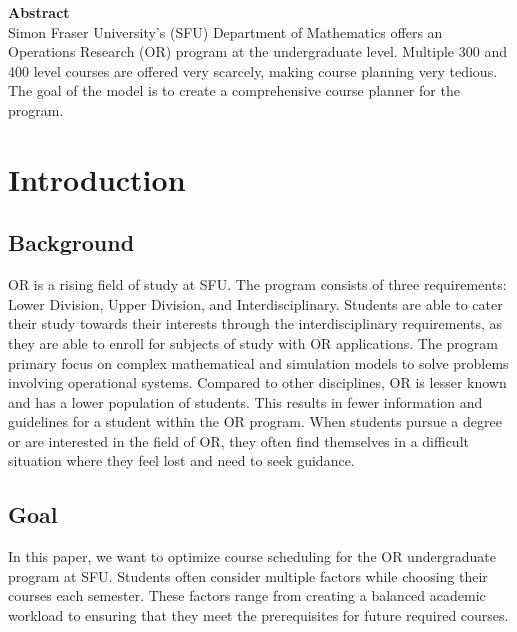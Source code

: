 \documentclass{article}
\begin{document}
\begin{titlepage}
	\vspace{5\baselineskip} %
	
	
	
	

\begin{center}
    \textbf{\large Abstract}\\
Simon Fraser University's (SFU) Department of Mathematics offers an Operations Research (OR) program at the undergraduate level. Multiple 300 and 400 level courses are offered very scarcely, making course planning very tedious. The goal of the model is to create a comprehensive course planner for the program.
\end{center}

\end{titlepage}





\section{Introduction}
\subsection{Background}


OR is a rising field of study at SFU.  The  program consists of three requirements: Lower Division, Upper Division, and Interdisciplinary. Students are able to cater their study towards their interests through the interdisciplinary requirements, as they are able to enroll for subjects of study with OR applications. The program primary focus on complex mathematical and simulation models to solve problems involving operational systems. Compared to other disciplines, OR is lesser known and has a lower population of students. This results in fewer information and guidelines for a student within the OR program. When students pursue a degree or are interested in the field of OR, they often find themselves in a difficult situation where they feel lost and need to seek guidance.

\subsection{Goal}

In this paper, we want to optimize course scheduling for the OR undergraduate program at SFU. Students often consider multiple factors while choosing their courses each semester. These factors range from creating a balanced academic workload to ensuring that they meet the prerequisites for future required courses.\\
\end{document}
